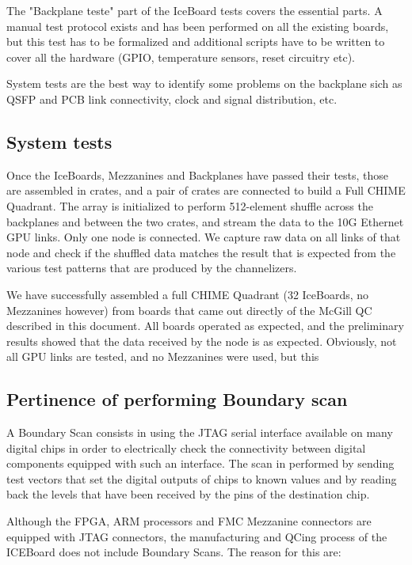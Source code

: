 \documentclass[11pt,article]{memoir}
\begin{document}
The "Backplane teste" part of the IceBoard tests covers the essential parts. A manual test protocol exists and has been performed on all the existing boards, but this test has to be formalized and additional scripts have to be written to cover all the hardware (GPIO, temperature sensors, reset circuitry etc).

System tests are the best way to identify some problems on the backplane sich as QSFP and PCB link connectivity, clock and signal distribution, etc.


\subsection{System tests}


Once the IceBoards, Mezzanines and Backplanes have passed their tests, those are assembled in crates, and a pair of crates are connected to build a Full CHIME Quadrant. The array is initialized to perform 512-element shuffle across the backplanes and between the two crates, and stream the data to the 10G Ethernet GPU links. Only one node is connected. We capture raw data on all links of that node and check if the shuffled data matches the result that is expected from the various test patterns that are produced by the channelizers.


We have successfully assembled a full CHIME Quadrant (32 IceBoards, no Mezzanines however) from boards that came out directly of the McGill QC described in this document. All boards operated as expected, and the preliminary results showed that the data received by the node is as expected. Obviously, not all GPU links are tested, and no Mezzanines were used, but this

\subsection{Pertinence of performing Boundary scan}

A Boundary Scan consists in using the JTAG serial interface available on many
digital chips in order to electrically check the connectivity between
digital components equipped with such an interface. The scan in performed by sending
test vectors that set the digital outputs of chips to known values and by
reading back the levels that have been received by the pins of the destination
chip.

Although the FPGA, ARM processors and FMC Mezzanine connectors are equipped
with JTAG connectors, the manufacturing and QCing process of the ICEBoard does
not include Boundary Scans. The reason for this are:
\end{document}
